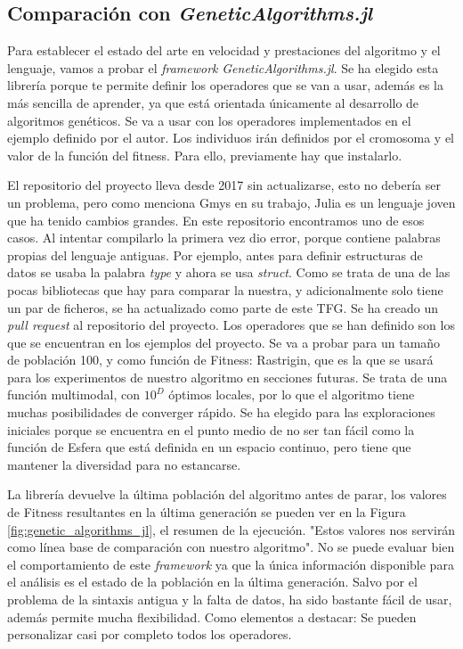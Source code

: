 \subsection{Comparación con \emph{GeneticAlgorithms.jl}}

Para establecer el estado del arte en velocidad y prestaciones del algoritmo y el lenguaje, vamos a probar
el \emph{framework} \emph{GeneticAlgorithms.jl}. Se ha elegido esta librería porque te permite definir los operadores que se van a usar, además es la más sencilla de aprender,
ya que está orientada únicamente al desarrollo de algoritmos genéticos. Se va a usar con los operadores implementados en el ejemplo definido por el autor. Los individuos 
irán definidos por el cromosoma y el valor de la función del fitness. Para ello, previamente hay que instalarlo.

El repositorio del proyecto lleva desde 2017 sin actualizarse, esto no debería ser un problema, pero como menciona Gmys \cite{comparative_study}
en su trabajo, Julia es un lenguaje joven que ha tenido cambios grandes. En este repositorio encontramos uno de esos casos. Al intentar compilarlo la primera vez dio error, porque contiene
palabras propias del lenguaje antiguas. Por ejemplo, antes para definir estructuras de datos se usaba la palabra \emph{type} y ahora se usa \emph{struct}. Como se trata de una de las pocas
bibliotecas que hay para comparar la nuestra, y adicionalmente solo tiene un par de ficheros, se ha actualizado como parte de este TFG. Se ha creado un \emph{pull request} al repositorio del proyecto.
Los operadores que se han definido son los que se encuentran en los ejemplos del proyecto. Se va a probar para un tamaño de población 100, y como función de Fitness: Rastrigin, 
que es la que se usará para los experimentos de nuestro algoritmo en secciones futuras. Se trata de una función multimodal, con $10^{D}$ óptimos locales, por lo que el algoritmo 
tiene muchas posibilidades de converger rápido. Se ha elegido para las exploraciones iniciales porque se encuentra en el punto medio de no ser tan fácil como la función de Esfera 
que está definida en un espacio continuo, pero tiene que mantener la diversidad para
no estancarse.

La librería devuelve la última población del algoritmo antes de parar, los valores de Fitness resultantes en la última generación se pueden ver en la Figura \ref{fig:genetic_algorithms_jl},
el resumen de la ejecución. "Estos valores nos servirán como línea base de comparación con nuestro algoritmo". No se puede evaluar bien el comportamiento de este \emph{framework} ya que 
la única información disponible para el análisis es el estado de la población en la última generación. Salvo por el problema de la sintaxis antigua y la falta de datos,
ha sido bastante fácil de usar, además permite mucha flexibilidad. Como elementos a destacar: Se pueden personalizar casi por completo todos los operadores.

